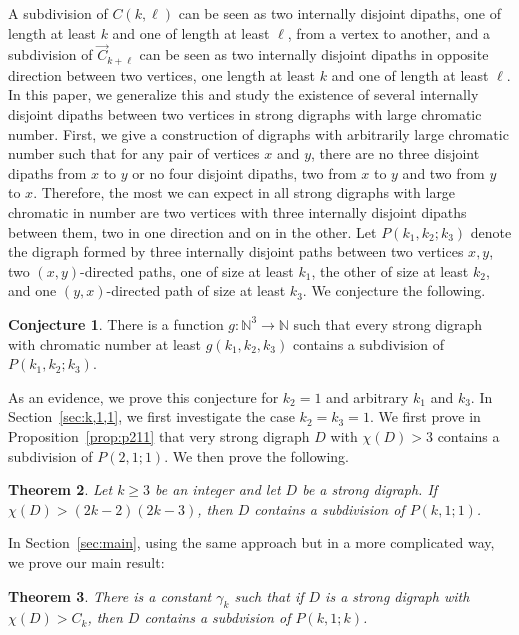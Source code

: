 \documentclass[utf8,10pt]{article}
\theoremstyle{plain}
\newtheorem{theorem}{Theorem}
\theoremstyle{definition}
\newtheorem{conjecture}[theorem]{Conjecture}
\theoremstyle{remark}
\begin{document}
A subdivision of $C(k,\ell)$ can be seen as two internally disjoint dipaths, one of length at least $k$ and one of length at least $\ell$, from a vertex to another, and a subdivision of $\vec{C}_{k+\ell}$ can be seen as two internally disjoint dipaths in opposite direction between two vertices, one length at least $k$ and one of length at least $\ell$.
In this paper, we generalize this and study the existence of several internally disjoint dipaths between two vertices in strong digraphs with large chromatic number.
First, we give a construction of digraphs with arbitrarily large chromatic number such that for any pair of vertices
$x$ and $y$, there are no three disjoint dipaths from $x$ to $y$ or no four disjoint dipaths, two from $x$ to $y$ and two from $y$ to $x$. 
Therefore, the most we can expect in all strong digraphs with large chromatic in number are two vertices with three internally disjoint dipaths between them, two in one direction and on in the other.
Let $P(k_1,k_2;k_3)$ denote the digraph formed by three internally disjoint paths between two vertices $x,y$,
two $(x,y)$-directed paths, one of size at least $k_1$, the other of size at least $k_2$, and one $(y,x)$-directed path of size at least $k_3$.
We conjecture the following.

\begin{conjecture}\label{conj:3chemins}
There is a function $g:\mathbb{N}^3 \rightarrow \mathbb{N}$ such that  every strong digraph with chromatic number at least $g(k_1,k_2,k_3)$ contains
a subdivision of $P(k_1,k_2;k_3)$.
\end{conjecture}

As an evidence, we prove this conjecture for $k_2=1$ and arbitrary $k_1$ and $k_3$. In Section~\ref{sec:k,1,1}, we first investigate the case $k_2=k_3=1$. We first prove in Proposition~\ref{prop:p211} that very strong digraph $D$ with $\chi(D)>3$ contains a subdivision of $P(2,1;1)$. We then prove the following.


\begin{theorem}\label{th:P11k}
Let $k \geq 3$ be an integer and let $D$ be a strong digraph. If $\chi(D) >  (2k-2)(2k-3)$, then $D$ contains a subdivision of $P(k,1;1)$.
\end{theorem}

In Section~\ref{sec:main}, using the same approach but in a more complicated way, we prove our main result: 

\begin{theorem}\label{th:main}
There is a constant $\gamma_k$ such that if $D$ is a strong digraph with $\chi(D) > C_k$, then $D$ contains a subdvision of $P(k,1;k)$.
\end{theorem}
\end{document}

